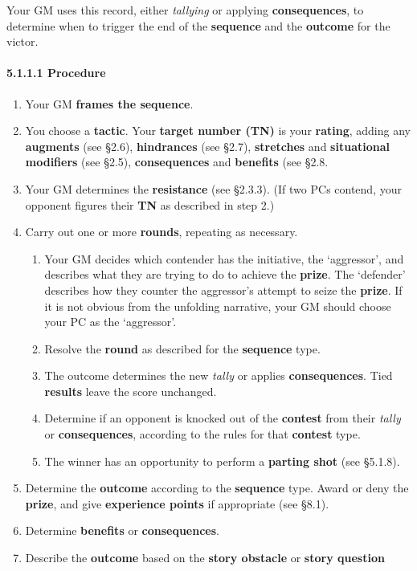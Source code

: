 \documentclass[
  11pt,
]{article}
\providecommand{\tightlist}{%
  \setlength{\itemsep}{0pt}\setlength{\parskip}{0pt}}
\begin{document}
Your GM uses this record, either \emph{tallying} or applying
\textbf{consequences}, to determine when to trigger the end of the
\textbf{sequence} and the \textbf{outcome} for the victor.

\hypertarget{procedure-3}{%
\paragraph{5.1.1.1 Procedure}\label{procedure-3}}

\begin{enumerate}
\def\labelenumi{\arabic{enumi}.}
\tightlist
\item
  Your GM \textbf{frames the sequence}.
\item
  You choose a \textbf{tactic}. Your \textbf{target number (TN)} is your
  \textbf{rating}, adding any \textbf{augments} (see §2.6),
  \textbf{hindrances} (see §2.7), \textbf{stretches} and
  \textbf{situational modifiers} (see §2.5), \textbf{consequences} and
  \textbf{benefits} (see §2.8.
\item
  Your GM determines the \textbf{resistance} (see §2.3.3). (If two PCs
  contend, your opponent figures their \textbf{TN} as described in step
  2.)
\item
  Carry out one or more \textbf{rounds}, repeating as necessary.

  \begin{enumerate}
  \def\labelenumii{\arabic{enumii}.}
  \tightlist
  \item
    Your GM decides which contender has the initiative, the `aggressor',
    and describes what they are trying to do to achieve the
    \textbf{prize}. The `defender' describes how they counter the
    aggressor's attempt to seize the \textbf{prize}. If it is not
    obvious from the unfolding narrative, your GM should choose your PC
    as the `aggressor'.
  \item
    Resolve the \textbf{round} as described for the \textbf{sequence}
    type.
  \item
    The outcome determines the new \emph{tally} or applies
    \textbf{consequences}. Tied \textbf{results} leave the score
    unchanged.
  \item
    Determine if an opponent is knocked out of the \textbf{contest} from
    their \emph{tally} or \textbf{consequences}, according to the rules
    for that \textbf{contest} type.
  \item
    The winner has an opportunity to perform a \textbf{parting shot}
    (see §5.1.8).
  \end{enumerate}
\item
  Determine the \textbf{outcome} according to the \textbf{sequence}
  type. Award or deny the \textbf{prize}, and give \textbf{experience
  points} if appropriate (see §8.1).
\item
  Determine \textbf{benefits} or \textbf{consequences}.
\item
  Describe the \textbf{outcome} based on the \textbf{story obstacle} or
  \textbf{story question}
\end{enumerate}
\end{document}
